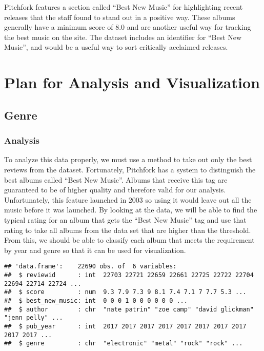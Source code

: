 \documentclass{article}
\begin{document}
Pitchfork features a section called ``Best New Music'' for highlighting
recent releases that the staff found to stand out in a positive way.
These albums generally have a minimum score of 8.0 and are another
useful way for tracking the best music on the site. The dataset includes
an identifier for ``Best New Music'', and would be a useful way to sort
critically acclaimed releases.

\hypertarget{plan-for-analysis-and-visualization}{%
\section{Plan for Analysis and
Visualization}\label{plan-for-analysis-and-visualization}}

\hypertarget{genre}{%
\subsection{Genre}\label{genre}}

\hypertarget{analysis}{%
\subsubsection{Analysis}\label{analysis}}

To analyze this data properly, we must use a method to take out only the
best reviews from the dataset. Fortunately, Pitchfork has a system to
distinguish the best albums called ``Best New Music''. Albums that
receive this tag are guaranteed to be of higher quality and therefore
valid for our analysis. Unfortunately, this feature launched in 2003 so
using it would leave out all the music before it was launched. By
looking at the data, we will be able to find the typical rating for an
album that gets the ``Best New Music'' tag and use that rating to take
all albums from the data set that are higher than the threshold. From
this, we should be able to classify each album that meets the
requirement by year and genre so that it can be used for visualization.

\begin{verbatim}
## 'data.frame':    22690 obs. of  6 variables:
##  $ reviewid      : int  22703 22721 22659 22661 22725 22722 22704 22694 22714 22724 ...
##  $ score         : num  9.3 7.9 7.3 9 8.1 7.4 7.1 7 7.7 5.3 ...
##  $ best_new_music: int  0 0 0 1 0 0 0 0 0 0 ...
##  $ author        : chr  "nate patrin" "zoe camp" "david glickman" "jenn pelly" ...
##  $ pub_year      : int  2017 2017 2017 2017 2017 2017 2017 2017 2017 2017 ...
##  $ genre         : chr  "electronic" "metal" "rock" "rock" ...
\end{verbatim}
\end{document}
